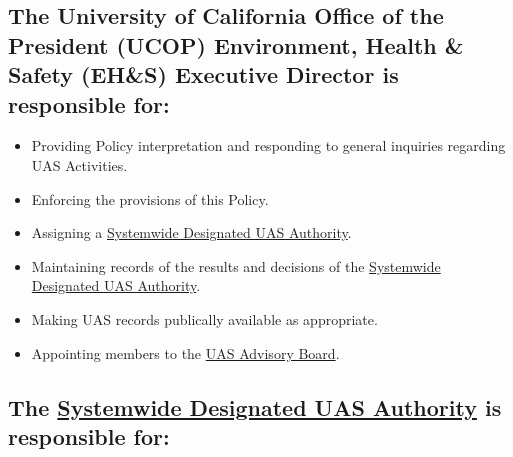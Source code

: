 \documentclass[
]{book}
\providecommand{\tightlist}{%
  \setlength{\itemsep}{0pt}\setlength{\parskip}{0pt}}
\begin{document}
\hypertarget{the-university-of-california-office-of-the-president-ucop-environment-health-safety-ehs-executive-director-is-responsible-for}{%
\subsection{The University of California Office of the President (UCOP) Environment, Health \& Safety (EH\&S) Executive Director is responsible for:}\label{the-university-of-california-office-of-the-president-ucop-environment-health-safety-ehs-executive-director-is-responsible-for}}

\begin{itemize}
\tightlist
\item
  Providing Policy interpretation and responding to general inquiries regarding UAS Activities.
\item
  Enforcing the provisions of this Policy.
\item
  Assigning a \protect\hyperlink{SDA}{Systemwide Designated UAS Authority}.
\item
  Maintaining records of the results and decisions of the \protect\hyperlink{SDA}{Systemwide Designated UAS Authority}.
\item
  Making UAS records publically available as appropriate.
\item
  Appointing members to the \protect\hyperlink{AB}{UAS Advisory Board}.
\end{itemize}

\hypertarget{the-refsda-is-responsible-for}{%
\subsection{The \protect\hyperlink{SDA}{Systemwide Designated UAS Authority} is responsible for:}\label{the-refsda-is-responsible-for}}
\end{document}
